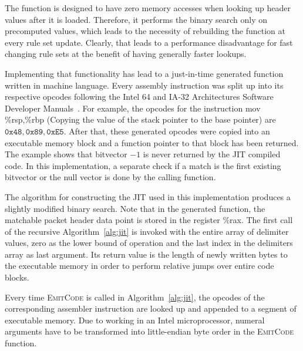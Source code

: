 \documentclass[conference]{IEEEtran}
\begin{document}
The function is designed to have zero memory accesses when looking up header 
values after it is loaded.
Therefore, it performs the binary search only on precomputed values, which 
leads to the necessity of rebuilding the function at every rule set update.
Clearly, that leads to a performance disadvantage for fast changing rule sets at the benefit of having generally faster lookups.

Implementing that functionality has lead to a just-in-time generated function written in machine 
language.
Every assembly instruction was split up into its respective opcodes following the 
Intel 64 and IA-32 Architectures Software Developer Manuals~\cite{intelsys}.
For example, the opcodes for the instruction 
\textsf{mov \%rsp,\%rbp} (Copying the value of the stack pointer to the base pointer) 
are $\texttt{0x48}, \texttt{0x89}, \texttt{0xE5}$.
After that, these generated opcodes were copied into an executable memory block and a function pointer to that block has been returned.
The example shows that bitvector $-1$ is never returned by the JIT compiled code.
In this implementation, a separate check if a match is the first existing bitvector or the null 
vector is done by the calling function.

The algorithm for constructing the JIT used in this implementation produces a slightly modified binary search.
Note that in the generated function, the matchable packet header data point is stored in the register \textsf{\%rax}.
The first call of the recursive Algorithm~\ref{alg:jit} is invoked with the entire array of delimiter values,
zero as the lower bound of operation and the last index in the delimiters array as last argument.
Its return value is the length of newly written bytes to the executable memory in order to perform relative jumps over entire code blocks.

Every time \textsc{EmitCode} is called in Algorithm~\ref{alg:jit}, the opcodes 
of the corresponding assembler instruction are looked up and appended to a segment of executable memory.
Due to working in an Intel microprocessor, numeral arguments have to be 
transformed into little-endian byte order in the \textsc{EmitCode} function.
\end{document}
